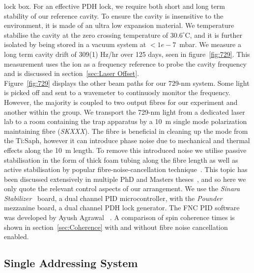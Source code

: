     lock box. For an effective PDH lock, we require both short and long term
    stability of our reference cavity. To ensure the cavity is insensitive to
    the environment, it is made of an ultra low expansion material. We
    temperature stabilise the cavity at the zero crossing temperature of
    $30.6^\circ$C, and it is further isolated by being stored in a vacuum system
    at $<1e-7$~mbar. We measure a long term cavity drift of 309(1) Hz/hr over
    125 days, seen in figure~\ref{fig:729}. This measurement uses the ion as a
    frequency reference to probe the cavity frequency and is discussed in
    section~\ref{sec:Laser Offset}.\\
    Figure~\ref{fig:729} displays the other beam paths for our 729-nm system.
    Some light is picked off and sent to a wavemeter to continuosly monitor the
    frequency. However, the majority is coupled to two output fibres for our
    experiment and another within the group. We transport the 729-nm light from
    a dedicated laser lab to a room containing the trap apparatus by a 10~m
    single mode polarization maintaining fibre (\emph{SKXXX}).  The fibre is
    beneficial in cleaning up the mode from the Ti:Saph, however it can
    introduce phase noise due to mechanical and thermal effects along the 10~m
    length. To remove this introduced noise we utilise passive stabilisation in
    the form of thick foam tubing along the fibre length as well as active
    stabilisation by popular fibre-noise-cancellation technique~\cite{XXX}. This
    topic has been discussed extensively in multiple PhD and Masters
    theses~\cite{XXX}, and so here we only quote the relevant control aspects of
    our arrangement. We use the \emph{Sinara Stabilizer}~\cite{XXX} board, a
    dual channel PID microcontroller, with the \emph{Pounder}~\cite{XXX}
    mezzanine board, a dual channel PDH lock generator. The FNC PID software was
    developed by Ayush Agrawal ~\cite{XXX}. A comparison of spin coherence times
    is shown in section~\ref{sec:Coherence} with and without fibre noise
    cancellation enabled. \\


\subsection{Single Addressing System}
\label{sec:Single Addressing System}
